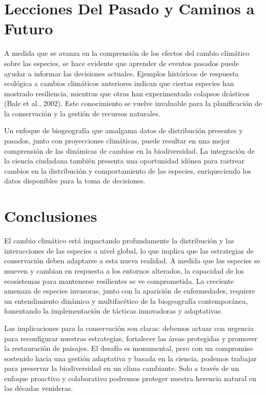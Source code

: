 \documentclass[
  letterpaper,
  DIV=11,
  numbers=noendperiod,
  oneside]{scrreprt}
\begin{document}
\section{Lecciones Del Pasado y Caminos a
Futuro}\label{lecciones-del-pasado-y-caminos-a-futuro}

A medida que se avanza en la comprensión de los efectos del cambio
climático sobre las especies, se hace evidente que aprender de eventos
pasados puede ayudar a informar las decisiones actuales. Ejemplos
históricos de respuesta ecológica a cambios climáticos anteriores
indican que ciertas especies han mostrado resiliencia, mientras que
otras han experimentado colapsos drásticos (Bale et al., 2002). Este
conocimiento se vuelve invaluable para la planificación de la
conservación y la gestión de recursos naturales.

Un enfoque de biogeografía que amalgama datos de distribución presentes
y pasados, junto con proyecciones climáticas, puede resultar en una
mejor comprensión de las dinámicas de cambios en la biodiversidad. La
integración de la ciencia ciudadana también presenta una oportunidad
idónea para rastrear cambios en la distribución y comportamiento de las
especies, enriqueciendo los datos disponibles para la toma de
decisiones.

\section{Conclusiones}\label{conclusiones-7}

El cambio climático está impactando profundamente la distribución y las
interacciones de las especies a nivel global, lo que implica que las
estrategias de conservación deben adaptarse a esta nueva realidad. A
medida que las especies se mueven y cambian en respuesta a los entornos
alterados, la capacidad de los ecosistemas para mantenerse resilientes
se ve comprometida. La creciente amenaza de especies invasoras, junto
con la aparición de enfermedades, requiere un entendimiento dinámico y
multifacético de la biogeografía contemporánea, fomentando la
implementación de tácticas innovadoras y adaptativas.

Las implicaciones para la conservación son claras: debemos actuar con
urgencia para reconfigurar nuestras estrategias, fortalecer las áreas
protegidas y promover la restauración de paisajes. El desafío es
monumental, pero con un compromiso sostenido hacia una gestión
adaptativa y basada en la ciencia, podemos trabajar para preservar la
biodiversidad en un clima cambiante. Solo a través de un enfoque
proactivo y colaborativo podremos proteger nuestra herencia natural en
las décadas venideras.
\end{document}
